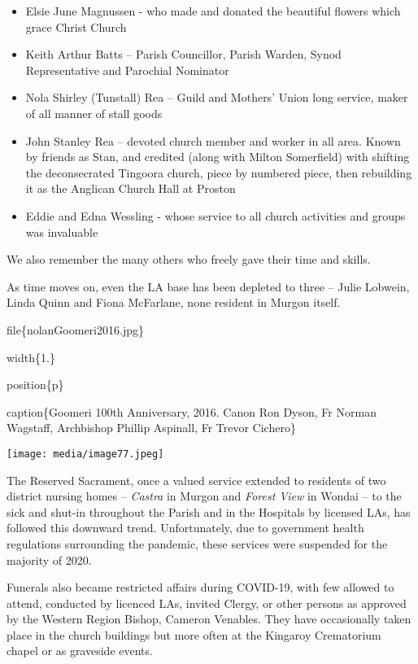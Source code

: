\begin{itemize}
\item
  Elsie June Magnussen - who made and donated the beautiful flowers which grace Christ Church
\item
  Keith Arthur Batts -- Parish Councillor, Parish Warden, Synod Representative and Parochial Nominator
\item
  Nola Shirley (Tunstall) Rea -- Guild and Mothers' Union long service, maker of all manner of stall goods
\item
  John Stanley Rea -- devoted church member and worker in all area. Known by friends as Stan, and credited (along with Milton Somerfield) with shifting the deconsecrated Tingoora church, piece by numbered piece, then rebuilding it as the Anglican Church Hall at Proston
\item
  Eddie and Edna Wessling - whose service to all church activities and groups was invaluable
\end{itemize}

We also remember the many others who freely gave their time and skills.

As time moves on, even the LA base has been depleted to three -- Julie Lobwein, Linda Quinn and Fiona McFarlane, none resident in Murgon itself.

file\{nolanGoomeri2016.jpg\}

width\{1.\}

position\{p\}

caption\{Goomeri 100th Anniversary, 2016. Canon Ron Dyson, Fr Norman Wagstaff, Archbishop Phillip Aspinall, Fr Trevor Cichero\}

\texttt{[image: media/image77.jpeg]}

The Reserved Sacrament, once a valued service extended to residents of two district nursing homes -- \emph{Castra} in Murgon and \emph{Forest View} in Wondai -- to the sick and shut-in throughout the Parish and in the Hospitals by licensed LAs, has followed this downward trend. Unfortunately, due to government health regulations surrounding the pandemic, these services were suspended for the majority of 2020.

Funerals also became restricted affairs during COVID-19, with few allowed to attend, conducted by licenced LAs, invited Clergy, or other persons as approved by the Western Region Bishop, Cameron Venables. They have occasionally taken place in the church buildings but more often at the Kingaroy Crematorium chapel or as graveside events.

